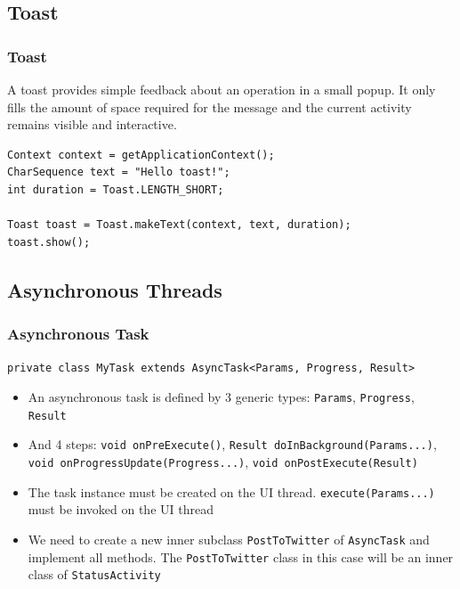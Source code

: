 \subsection{Toast}

\begin{frame}[fragile]
\frametitle{Toast}

\lstset{language=java, style=eclipse, breaklines=true, tabsize=2}
A toast provides simple feedback about an operation in a small popup. It only fills the amount of space required for the message and the current activity remains visible and interactive. 
\begin{lstlisting}
Context context = getApplicationContext();
CharSequence text = "Hello toast!";
int duration = Toast.LENGTH_SHORT;

Toast toast = Toast.makeText(context, text, duration);
toast.show();
\end{lstlisting}
\end{frame}



\subsection{Asynchronous Threads}
\begin{frame}[fragile]
\frametitle{Asynchronous Task }

\lstset{language=java, style=eclipse, breaklines=true, tabsize=2}
\centering
\lstinline{private class MyTask extends AsyncTask<Params, Progress, Result> }

\begin{itemize}
\item An asynchronous task is defined by 3 generic types: \lstinline{Params}, \lstinline{Progress}, \lstinline{Result}

\item And 4 steps:
\lstinline{void onPreExecute()}, \lstinline{Result doInBackground(Params...)}, \lstinline{void onProgressUpdate(Progress...)}, \lstinline{void onPostExecute(Result)}

\item The task instance must be created on the UI thread. \lstinline{execute(Params...)} must be invoked on the UI thread

\item We need to create a new inner subclass \lstinline{PostToTwitter} of \lstinline{AsyncTask} and implement all methods. The \lstinline{PostToTwitter} class in this case will be an inner class of \lstinline{StatusActivity}

\end{itemize}

\end{frame}

